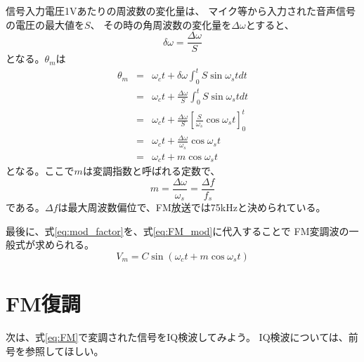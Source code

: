 信号入力電圧1Vあたりの周波数の変化量は、
マイク等から入力された音声信号の電圧の最大値を$S$、
その時の角周波数の変化量を$\Delta\omega$とすると、
\[\delta\omega = \frac{\Delta\omega}{S}\]
となる。$\theta_m$は
\begin{eqnarray}
\theta_m &=& \omega_ct + \delta\omega\int_{0}^{t}S\sin\omega_st dt \nonumber\\
&=& \omega_c t + \frac{\Delta\omega}{S} \int_{0}^{t}S\sin\omega_st dt \nonumber\\
&=& \omega_c t + \frac{\Delta\omega}{S}[\frac{S}{\omega_s}\cos\omega_st]_{0}^{t} \nonumber\\
&=& \omega_c t + \frac{\Delta\omega}{\omega_s}\cos\omega_st \nonumber\\
&=& \omega_c t + m\cos\omega_s t
\end{eqnarray}
となる。ここで$m$は変調指数と呼ばれる定数で、
\begin{equation}
m = \frac{\Delta\omega}{\omega_s} = \frac{\Delta f}{f_s} \label{eq:mod_factor}
\end{equation}
である。$\Delta f$は最大周波数偏位で、FM放送では75kHzと決められている。

最後に、式\ref{eq:mod_factor}を、式\ref{eq:FM_mod}に代入することで
FM変調波の一般式が求められる。
\begin{equation}
  V_m = C\sin(\omega_c t + m\cos\omega_st) \label{eq:FM}
\end{equation}

\section*{FM復調}
次は、式\ref{eq:FM}で変調された信号をIQ検波してみよう。
IQ検波については、前号を参照してほしい。

